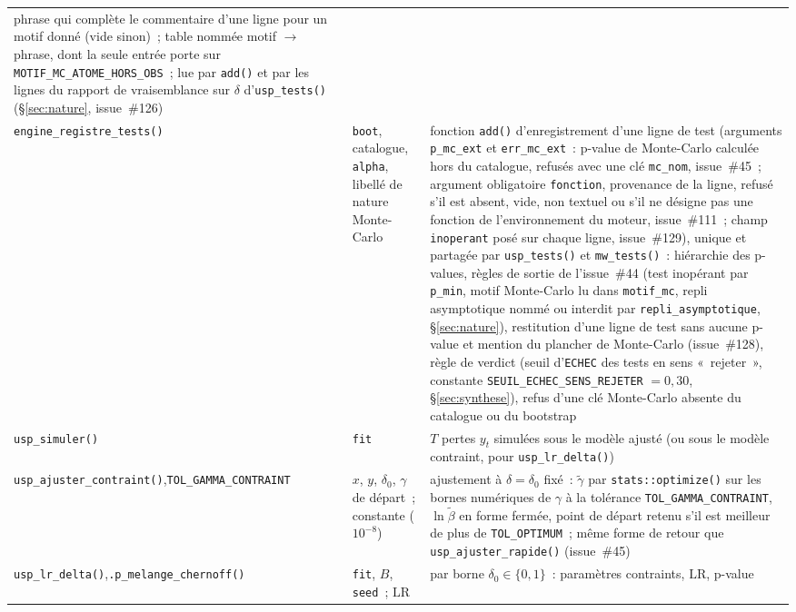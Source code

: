 \documentclass[a4paper,11pt]{article}
\newcommand{\code}[1]{\texttt{\small #1}}
\begin{document}
{\begin{longtable}{@{}p{4.6cm}p{4.0cm}p{6.2cm}@{}}
phrase qui complète le commentaire d'une ligne pour un motif donné (vide sinon)~; table nommée
motif $\to$ phrase, dont la seule entrée porte sur \code{MOTIF\_MC\_ATOME\_HORS\_OBS}~; lue par
\code{add()} et par les lignes du rapport de vraisemblance sur $\delta$ d'\code{usp\_tests()}
(§\ref{sec:nature}, issue~\#126) \\
\code{engine\_registre\_}\newline\code{tests()} & \code{boot}, catalogue, \code{alpha},
libellé de nature Monte-Carlo & fonction \code{add()} d'enregistrement d'une ligne de test
(arguments \code{p\_mc\_ext} et \code{err\_mc\_ext}~: p-value de Monte-Carlo calculée hors du
catalogue, refusés avec une clé \code{mc\_nom}, issue~\#45~; argument obligatoire
\code{fonction}, provenance de la ligne, refusé s'il est absent, vide, non textuel ou s'il ne
désigne pas une fonction de l'environnement du moteur, issue~\#111~; champ \code{inoperant}
posé sur chaque ligne, issue~\#129),
unique et partagée par \code{usp\_tests()} et \code{mw\_tests()}~: hiérarchie des p-values,
règles de sortie de l'issue~\#44 (test inopérant par \code{p\_min}, motif Monte-Carlo lu dans
\code{motif\_mc}, repli asymptotique nommé ou interdit par \code{repli\_asymptotique},
§\ref{sec:nature}), restitution d'une ligne de test sans aucune p-value et mention du plancher
de Monte-Carlo (issue~\#128), règle de verdict (seuil d'\code{ECHEC} des tests en sens «~rejeter~», constante
\code{SEUIL\_ECHEC\_SENS\_REJETER} $= 0{,}30$, §\ref{sec:synthese}), refus d'une clé
Monte-Carlo absente du catalogue ou du bootstrap \\
\code{usp\_simuler()} & \code{fit} & $T$ pertes $y_t$ simulées sous le modèle
ajusté (ou sous le modèle contraint, pour \code{usp\_lr\_delta()}) \\
\code{usp\_ajuster\_contraint()},\newline \code{TOL\_GAMMA\_CONTRAINT} & $x$, $y$, $\delta_0$,
$\gamma$ de départ~; constante ($10^{-8}$) & ajustement à $\delta = \delta_0$ fixé~: $\tilde\gamma$
par \code{stats::optimize()} sur les bornes numériques de $\gamma$ à la tolérance
\code{TOL\_GAMMA\_CONTRAINT}, $\ln\tilde\beta$ en forme fermée, point de départ retenu s'il est
meilleur de plus de \code{TOL\_OPTIMUM}~; même forme de retour que
\code{usp\_ajuster\_rapide()} (issue~\#45) \\
\code{usp\_lr\_delta()},\newline \code{.p\_melange\_chernoff()} & \code{fit}, $B$, \code{seed}~;
$\mathrm{LR}$ & par borne $\delta_0 \in \{0, 1\}$~: paramètres contraints, $\mathrm{LR}$, p-value

\end{longtable}}
\end{document}
